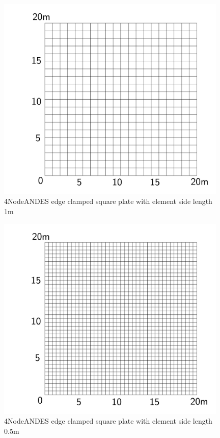 \documentclass[fleqn,11pt]{article}
\begin{document}
\newpage

\begin{figure}[H]
  \centering
  \includegraphics[width=11cm]{../Figure-files/square_plate4.pdf}
  \caption{4NodeANDES edge clamped square plate with element side length 1m }
  \label{fig 4NodeANDES edges clamped square plate with element side length 1m }
\end{figure}


\begin{figure}[H]
  \centering
  \includegraphics[width=11cm]{../Figure-files/square_plate5.pdf}
  \caption{4NodeANDES edge clamped square plate with element side length 0.5m }
  \label{fig 4NodeANDES edges clamped square plate with element side length 0.5m }
\end{figure}
\end{document}

